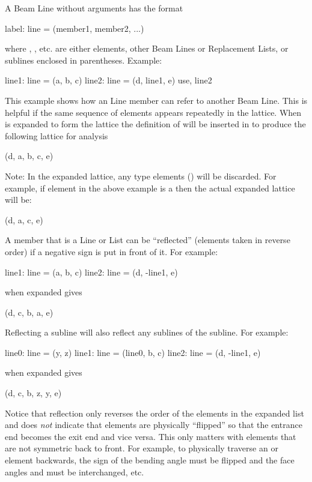 A Beam Line without arguments has the format
\begin{example}
  label: line = (member1, member2, ...)
\end{example}
where , , etc. are either elements, other Beam
Lines or Replacement Lists, or sublines enclosed in parentheses.
Example:
\begin{example}
  line1: line = (a, b, c)
  line2: line = (d, line1, e)
  use, line2
\end{example}
This example shows how an Line member can refer to another Beam Line.
This is helpful if the same sequence of elements appears repeatedly in
the lattice. When  is expanded to form the lattice the
definition of  will be inserted in to produce the following
lattice for analysis
\begin{example}
  (d, a, b, c, e)
\end{example}
Note: In the expanded lattice, any  type elements
() will be discarded. For example, if element 
in the above example is a  then the actual expanded
lattice will be:
\begin{example}
  (d, a, c, e)
\end{example}

A member that is a Line or List can be ``reflected''
(elements taken in reverse order) if
a negative sign is put in front of it. For example:
\begin{example}
  line1: line = (a, b, c)
  line2: line = (d, -line1, e)
\end{example}
 when expanded gives
\begin{example}
  (d, c, b, a, e)
\end{example}
Reflecting a subline will also reflect any sublines of the subline. For
example:
\begin{example}
  line0: line = (y, z)
  line1: line = (line0, b, c)
  line2: line = (d, -line1, e)
\end{example}
 when expanded gives
\begin{example}
  (d, c, b, z, y, e)
\end{example}
Notice that reflection only reverses the order of the elements in the
expanded list and does {\em not} indicate that elements are physically
``flipped'' so that the entrance end becomes the exit end and vice
versa. This only matters with elements that are not symmetric back to
front. For example, to physically traverse an  or 
element backwards, the sign of the bending angle must be flipped and
the face angles  and  must be interchanged, etc.

